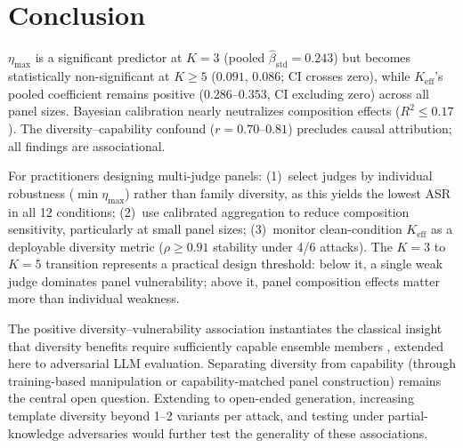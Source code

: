 \section{Conclusion}

$\eta_{\max}$ is a significant predictor at $K{=}3$ (pooled $\hat{\beta}_{\mathrm{std}}{=}0.243$) but becomes statistically non-significant at $K{\geq}5$ ($0.091$, $0.086$; CI crosses zero), while $K_{\mathrm{eff}}$'s pooled coefficient remains positive ($0.286$--$0.353$, CI excluding zero) across all panel sizes. Bayesian calibration nearly neutralizes composition effects ($R^2{\leq}0.17$). The diversity--capability confound ($r{=}0.70$--$0.81$) precludes causal attribution; all findings are associational.

For practitioners designing multi-judge panels: (1)~select judges by individual robustness ($\min \eta_{\max}$) rather than family diversity, as this yields the lowest ASR in all 12 conditions; (2)~use calibrated aggregation to reduce composition sensitivity, particularly at small panel sizes; (3)~monitor clean-condition $K_{\mathrm{eff}}$ as a deployable diversity metric ($\rho{\geq}0.91$ stability under 4/6 attacks). The $K{=}3$ to $K{=}5$ transition represents a practical design threshold: below it, a single weak judge dominates panel vulnerability; above it, panel composition effects matter more than individual weakness.

The positive diversity--vulnerability association instantiates the classical insight that diversity benefits require sufficiently capable ensemble members \citep{brown2005managing}, extended here to adversarial LLM evaluation. Separating diversity from capability (through training-based manipulation or capability-matched panel construction) remains the central open question. Extending to open-ended generation, increasing template diversity beyond 1--2 variants per attack, and testing under partial-knowledge adversaries would further test the generality of these associations.
